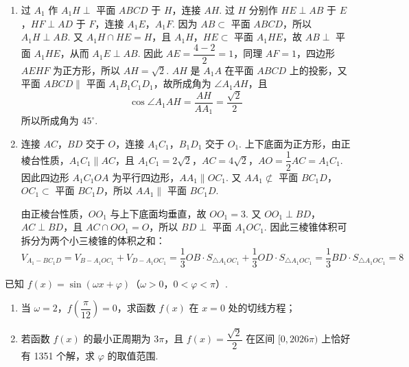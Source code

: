 \begin{solution}

\begin{enumerate}
\item 过 \(A_1\) 作 \(A_1H\perp\) 平面 \(ABCD\) 于 \(H\)，连接 \(AH\). 过 \(H\) 分别作 \(HE\perp AB\) 于 \(E\)，\(HF\perp AD\) 于 \(F\)，连接 \(A_1E\)，\(A_1F\). 因为 \(AB\subset\) 平面 \(ABCD\)，所以 \(A_1H\perp AB\). 又 \(A_1H\cap HE=H\)，且 \(A_1H\)，\(HE\subset\) 平面 \(A_1HE\)，故 \(AB\perp\) 平面 \(A_1HE\)，从而 \(A_1E\perp AB\). 因此 \(AE=\dfrac{4-2}{2}=1\)，同理 \(AF=1\)，四边形 \(AEHF\) 为正方形，所以 \(AH=\sqrt2\). \(AH\) 是 \(A_1A\) 在平面 \(ABCD\) 上的投影，又平面 \(ABCD\parallel\) 平面 \(A_1B_1C_1D_1\)，故所成角为 \(\angle A_1AH\)，且
\[
\cos\angle A_1AH=\frac{AH}{AA_1}=\frac{\sqrt2}{2}
\]
所以所成角为 \(45^\circ\).

\item 连接 \(AC\)，\(BD\) 交于 \(O\)，连接 \(A_1C_1\)，\(B_1D_1\) 交于 \(O_1\). 上下底面为正方形，由正棱台性质，\(A_1C_1\parallel AC\)，且 \(A_1C_1=2\sqrt2\)，\(AC=4\sqrt2\)，\(AO=\dfrac12AC=A_1C_1\). 因此四边形 \(A_1C_1OA\) 为平行四边形，\(AA_1\parallel OC_1\). 又 \(AA_1\not\subset\) 平面 \(BC_1D\)，\(OC_1\subset\) 平面 \(BC_1D\)，所以 \(AA_1\parallel\) 平面 \(BC_1D\).

由正棱台性质，\(OO_1\) 与上下底面均垂直，故 \(OO_1=3\). 又 \(OO_1\perp BD\)，\(AC\perp BD\)，且 \(AC\cap OO_1=O\)，所以 \(BD\perp\) 平面 \(A_1OC_1\). 因此三棱锥体积可拆分为两个小三棱锥的体积之和：
\[
V_{A_1-BC_1D}=V_{B-A_1OC_1}+V_{D-A_1OC_1}
=\frac13OB\cdot S_{\triangle A_1OC_1}+\frac13OD\cdot S_{\triangle A_1OC_1}
=\frac13BD\cdot S_{\triangle A_1OC_1}=8
\]
\end{enumerate}

\end{solution}

\begin{problem}
已知 \(f(x)=\sin(\omega x+\varphi)\)（\(\omega>0\)，\(0<\varphi<\pi\)）.

\begin{enumerate}
\item 当 \(\omega=2\)，\(f\!\left(\dfrac{\pi}{12}\right)=0\)，求函数 \(f(x)\) 在 \(x=0\) 处的切线方程；
\item 若函数 \(f(x)\) 的最小正周期为 \(3\pi\)，且 \(f(x)=\dfrac{\sqrt2}{2}\) 在区间 \([0,2026\pi)\) 上恰好有 1351 个解，求 \(\varphi\) 的取值范围.
\end{enumerate}
\end{problem}

